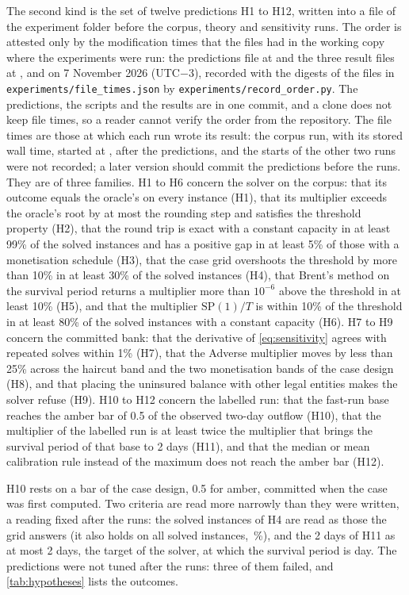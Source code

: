 The second kind is the set of twelve predictions H1 to H12, written into a file of the experiment folder before the corpus, theory and sensitivity runs. The order is attested only by the modification times that the files had in the working copy where the experiments were run: the predictions file at \tOrdHyp{} and the three result files at \tOrdC{}, \tOrdT{} and \tOrdK{} on 7 November 2026 (UTC$-3$), recorded with the digests of the files in \texttt{experiments/file\_times.json} by \texttt{experiments/record\_order.py}. The predictions, the scripts and the results are in one commit, and a clone does not keep file times, so a reader cannot verify the order from the repository. The file times are those at which each run wrote its result: the corpus run, with its stored wall time, started at \tOrdKStart{}, after the predictions, and the starts of the other two runs were not recorded; a later version should commit the predictions before the runs. They are of three families. H1 to H6 concern the solver on the corpus: that its outcome equals the oracle's on every instance (H1), that its multiplier exceeds the oracle's root by at most the rounding step and satisfies the threshold property (H2), that the round trip is exact with a constant capacity in at least 99\% of the solved instances and has a positive gap in at least 5\% of those with a monetisation schedule (H3), that the case grid overshoots the threshold by more than 10\% in at least 30\% of the solved instances (H4), that Brent's method on the survival period returns a multiplier more than $10^{-6}$ above the threshold in at least 10\% (H5), and that the multiplier $\mathrm{SP}(1)/T$ is within 10\% of the threshold in at least 80\% of the solved instances with a constant capacity (H6). H7 to H9 concern the committed bank: that the derivative of \cref{eq:sensitivity} agrees with repeated solves within 1\% (H7), that the Adverse multiplier moves by less than 25\% across the haircut band and the two monetisation bands of the case design (H8), and that placing the uninsured balance with other legal entities makes the solver refuse (H9). H10 to H12 concern the labelled run: that the fast-run base reaches the amber bar of 0.5 of the observed two-day outflow (H10), that the multiplier of the labelled run is at least twice the multiplier that brings the survival period of that base to 2 days (H11), and that the median or mean calibration rule instead of the maximum does not reach the amber bar (H12).

H10 rests on a bar of the case design, 0.5 for amber, committed when the case was first computed. Two criteria are read more narrowly than they were written, a reading fixed after the runs: the solved instances of H4 are read as those the grid answers (it also holds on all solved instances, \kHFourAll{}\,\%), and the 2 days of H11 as at most 2 days, the target of the solver, at which the survival period is \spAtTwo{} day. The predictions were not tuned after the runs: three of them failed, and \cref{tab:hypotheses} lists the outcomes.


